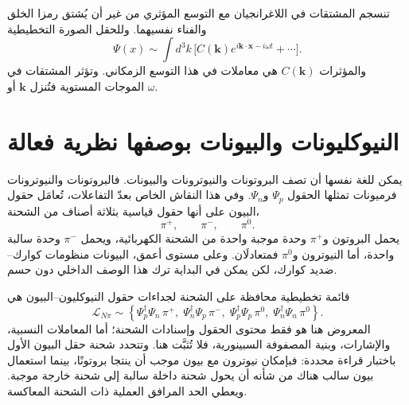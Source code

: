 تنسجم المشتقات في اللاغرانجيان مع التوسع المؤثري من غير أن يُشتق رمزا الخلق والفناء نفسيهما. وللحقل الصورة التخطيطية
\begin{equation}
\Psi(x)
\sim
\int d^3k\,
\bigl[
C(\mathbf k)e^{i\mathbf k\cdot\mathbf x-i\omega t}
+\cdots
\bigr].
\end{equation}
والمؤثرات \(C(\mathbf k)\) هي معاملات في هذا التوسع الزمكاني. وتؤثر المشتقات في الموجات المستوية فتُنزل \(\mathbf k\) أو \(\omega\).

\begin{classroomqa}
\end{classroomqa}

\section{النيوكليونات والبيونات بوصفها نظرية فعالة}

يمكن للغة نفسها أن تصف البروتونات والنيوترونات والبيونات. فالبروتونات والنيوترونات فرميونات تمثلها الحقول \(\Psi_p\) و\(\Psi_n\). وفي هذا النقاش الخاص بعدّ التفاعلات، تُعامَل حقول البيون على أنها حقول قياسية بثلاثة أصناف من الشحنة،
\begin{equation}
\pi^+,
\qquad
\pi^-,
\qquad
\pi^0.
\end{equation}
يحمل البروتون و\(\pi^+\) وحدة موجبة واحدة من الشحنة الكهربائية، ويحمل \(\pi^-\) وحدة سالبة واحدة، أما النيوترون و\(\pi^0\) فمتعادلَان. وعلى مستوى أعمق، البيونات منظومات كوارك--ضديد كوارك، لكن يمكن في البداية ترك هذا الوصف الداخلي دون حسم.

قائمة تخطيطية محافظة على الشحنة لجداءات حقول النيوكليون--البيون هي
\begin{equation}
\mathcal L_{N\pi}
\sim
\left\{
\Psi_p^\dagger\Psi_n\,\pi^+,\;
\Psi_n^\dagger\Psi_p\,\pi^-,\;
\Psi_p^\dagger\Psi_p\,\pi^0,\;
\Psi_n^\dagger\Psi_n\,\pi^0
\right\}.
\end{equation}
المعروض هنا هو فقط محتوى الحقول وإسنادات الشحنة؛ أما المعاملات النسبية، والإشارات، وبنية المصفوفة السبينورية، فلا تُثبَّت هنا. وتتحدد شحنة حقل البيون الأول باختبار قراءة محددة: فبإمكان نيوترون مع بيون موجب أن ينتجا بروتونًا، بينما استعمال بيون سالب هناك من شأنه أن يحول شحنة داخلة سالبة إلى شحنة خارجة موجبة. ويعطي الحد المرافق العملية ذات الشحنة المعاكسة.

